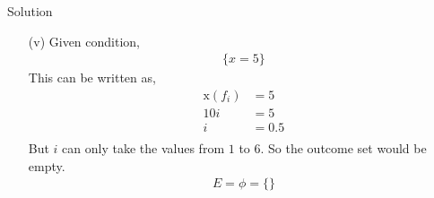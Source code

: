 \documentclass{beamer}
\providecommand{\x}[1]{\ensuremath{\text{x}\left(#1\right)}}
\begin{document}
\begin{frame}{Solution}
\begin{enumerate}
\item[(v)] Given condition,
\begin{align*}
\{x = 5\}
\end{align*}
This can be written as,
\begin{align*}
\x{f_i} & = 5\\
10i & = 5\\
i & = 0.5\\
\end{align*}
But $i$ can only take the values from $1$ to $6$.
So the outcome set would be empty.
\begin{align*}
E = \phi = \{\} 
\end{align*}
\end{enumerate}
\end{frame}
\end{document}

